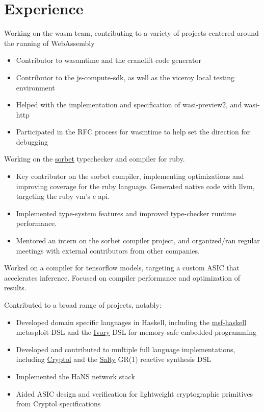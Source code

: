 \documentclass[letter,10pt]{moderncv}
\begin{document}
\makecvtitle

\section{Experience}

  {}{Working on the wasm team, contributing to a variety of projects centered around the running of WebAssembly
  \begin{itemize}%
  \item Contributor to wasamtime and the cranelift code generator
  \item Contributor to the js-compute-sdk, as well as the viceroy local testing environment
  \item Helped with the implementation and specification of wasi-preview2, and wasi-http
  \item Participated in the RFC process for wasmtime to help set the direction for debugging
  \end{itemize}}

  {}{Working on the \href{https://sorbet.org}{sorbet} typechecker and compiler for ruby.
  \begin{itemize}%
  \item Key contributor on the sorbet compiler, implementing optimizations and
    improving coverage for the ruby language. Generated native code with llvm,
    targeting the ruby vm's c api.
  \item Implemented type-system features and improved type-checker runtime performance.
  \item Mentored an intern on the sorbet compiler project, and organized/ran
    regular meetings with external contributors from other companies.
  \end{itemize}}

  {}{Worked on a compiler for tensorflow models, targeting a custom ASIC
  that accelerates inference. Focused on compiler performance and optimization
  of results.}

  {}{Contributed to a broad range of projects, notably:
  \begin{itemize}%
  \item Developed domain specific languages in Haskell, including the
    \href{https://github.com/galoisinc/msf-haskell}{msf-haskell} metasploit DSL
    and the \href{https://github.com/galoisinc/ivory}{Ivory} DSL for memory-safe
    embedded programming
  \item Developed and contributed to multiple full language implementations,
    including \href{https://github.com/galoisinc/cryptol}{Cryptol} and the
    \href{https://github.com/galoisinc/salty}{Salty} GR(1) reactive synthesis DSL
  \item Implemented the HaNS network stack
  \item Aided ASIC design and verification for lightweight cryptographic
    primitives from Cryptol specifications
  \end{itemize}}
\end{document}
